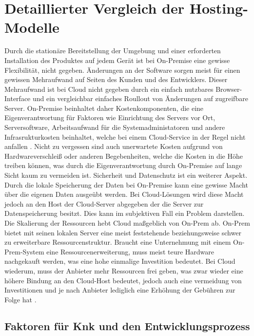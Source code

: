 \documentclass[12pt,bibtotoc]{article}
\begin{document}
	\section{Detaillierter Vergleich der Hosting-Modelle}
			Durch die stationäre Bereitstellung der Umgebung und einer erforderten Installation des Produktes auf jedem Gerät ist bei On-Premise eine gewisse Flexibilität, nicht gegeben.
			Änderungen an der Software sorgen meist für einen gewissen Mehraufwand auf Seiten des Kunden und des Entwicklers. Dieser Mehraufwand ist bei Cloud nicht gegeben durch ein einfach nutzbares Browser-Interface und ein vergleichbar einfaches Roullout von Änderungen auf zugreifbare Server. 
			On-Premise beinhaltet daher Kostenkomponenten, die eine Eigenverantwortung für Faktoren wie Einrichtung des Servers vor Ort, Serversoftware, Arbeitsaufwand für die Systemadministatoren und andere Infrasrukturkosten beinhaltet, welche bei einem Cloud-Service in der Regel nicht anfallen \cite{Fisher.2018}.
			Nicht zu vergessen sind auch unerwartete Kosten aufgrund von Hardwareverschleiß oder anderen Begebenheiten, welche die Kosten in die Höhe treiben können, was durch die Eigenverantwortung durch On-Premise auf lange Sicht kaum zu vermeiden ist.
			\newline
			Sicherheit und Datenschutz ist ein weiterer Aspekt. Durch die lokale Speicherung der Daten bei On-Premise kann eine gewisse Macht über die eigenen Daten ausgeübt werden. 
			Bei Cloud-Lösungen wird diese Macht jedoch an den Host der Cloud-Server abgegeben der die Server zur Datenspeicherung besitzt. Dies kann im subjektiven Fall ein Problem darstellen. 
			\newline
			Die Skalierung der Ressourcen hebt Cloud maßgeblich von On-Prem ab. On-Prem bietet mit seinen lokalen Server eine meist feststehende beziehungsweise schwer zu erweiterbare Ressourcenstruktur. Braucht eine Unternehmung mit einem On-Prem-System eine 
			Ressourcenerweiterung, muss meist teure Hardware nachgekauft werden, was eine hohe einmalige Investition bedeutet.
			Bei Cloud wiederum, muss der Anbieter mehr Ressourcen frei geben, was zwar wieder eine höhere Bindung an den Cloud-Host bedeutet, jedoch auch eine vermeidung von Investitionen und je nach Anbieter lediglich eine Erhöhung der Gebühren zur Folge hat \cite{Murugesan.2016}.
			\newline
			\subsection{Faktoren für Knk und den Entwicklungsprozess}
\end{document}
